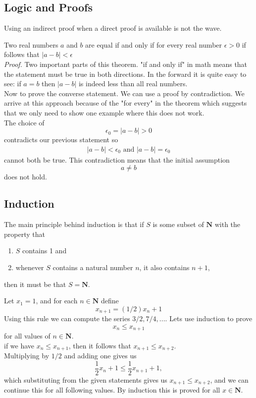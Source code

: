\subsection{Logic and Proofs}
Using an indirect proof when a direct proof is available is not the wave. 
\begin{theorem}
	Two real numbers $ a $ and $ b $ are equal if and only if for every real number $ \epsilon > 0$ if follows that $ |a-b| < \epsilon $ \\
	\textit{Proof.} Two important parts of this theorem. "if and only if" in math means that the statement must be true in both directions. In the forward it is quite easy to see: if $ a = b $ then $ |a-b| $ is indeed less than all real numbers. \\
	Now to prove the converse statement. We can use a proof by contradiction. We arrive at this approach because of the "for every" in the theorem which suggests that we only need to show one example where this does not work. \\
	The choice of
	\[ \epsilon_0 = |a-b| > 0 \]
	contradicts our previous statement so 
	\begin{gather}
		|a-b| < \epsilon_0 \mbox{ and } |a-b|= \epsilon_0
	\end{gather}
	cannot both be true. This contradiction means that the initial assumption \[ a \neq b \] does not hold. 
\end{theorem}
\subsection{Induction}
The main principle behind induction is that if $ S $ is some subset of $ \textbf{N} $ with the property that
\begin{enumerate}
	\item $ S $ contains 1 and
	\item whenever $ S $ contains a natural number $ n $, it also contains $ n + 1 $,
\end{enumerate}
then it must be that $ S = \textbf{N} $. 
\begin{example}
	Let $ x_1 = 1 $, and for each $ n \in \textbf{N} $ define \[ x_{n+1} = (1/2)x_n + 1 \]
	Using this rule we can compute the series $ 3/2, 7/4, ... $. Lets use induction to prove 
	\[ x_n \leq x_{n+1} \] 
	for all values of $ n \in \textbf{N} $. \\
	if we have $ x_n \leq x_{n+1} $, then it follows that $ x_{n+1} \leq x_{n+2} $. \\
	Multiplying by $ 1/2 $ and adding one gives us 
	\[ \dfrac{1}{2} x_n + 1 \leq \dfrac{1}{2} x_{n+1} + 1, \]
	which substituting from the given statements gives us $ x_{n+1} \leq x_{n+2} $, and we can continue this for all following values. By induction this is proved for all $ x \in \textbf{N} $. 
\end{example}
